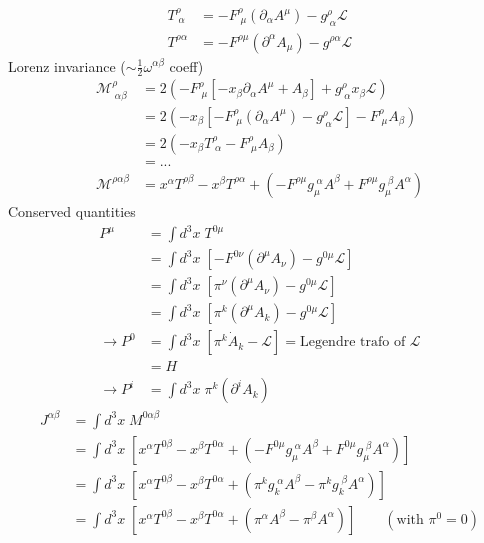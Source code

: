 \documentclass[10pt,a4paper]{report}
\theoremstyle{definition}
\begin{document}
\begin{enumerate}[a)]
\begin{align}
T^\rho_{\;\alpha}&=-F^\rho_{\;\mu}(\partial_\alpha A^\mu)-g^\rho_{\;\alpha}\mathcal{L}\\
T^{\rho\alpha}&=-F^{\rho\mu}(\partial^\alpha A_\mu)-g^{\rho\alpha}\mathcal{L}
\end{align}
Lorenz invariance ($\sim\frac{1}{2}\omega^{\alpha\beta}$ coeff)
\begin{align}
\mathcal{M}^{\rho}_{\;\alpha\beta}
&=2(-F^\rho_{\;\mu}[-x_\beta\partial_\alpha A^\mu+A_\beta]+g^\rho_{\;\alpha} x_\beta\mathcal{L})\\
&=2(-x_\beta[-F^\rho_{\;\mu}(\partial_\alpha A^\mu)-g^\rho_{\;\alpha}\mathcal{L}]-F^\rho_{\;\mu}A_\beta)\\
&=2(-x_\beta T^\rho_{\;\alpha}-F^\rho_{\;\mu}A_\beta)\\
&=...\\
\mathcal{M}^{\rho\alpha\beta}&=x^\alpha T^{\rho\beta}-x^\beta T^{\rho\alpha}+(-F^{\rho\mu}g_\mu^{\;\alpha}A^\beta+F^{\rho\mu}g_\mu^{\;\beta}A^\alpha)
\end{align}
Conserved quantities
\begin{align}
P^\mu
&=\int d^3x\;T^{0\mu}\\
&=\int d^3x\;[-F^{0\nu}(\partial^\mu A_\nu)-g^{0\mu}\mathcal{L}]\\
&=\int d^3x\;[\pi^\nu(\partial^\mu A_\nu)-g^{0\mu}\mathcal{L}]\\
&=\int d^3x\;[\pi^k(\partial^\mu A_k)-g^{0\mu}\mathcal{L}]\\
\rightarrow P^0
&=\int d^3x\;[\pi^k\dot{A}_k-\mathcal{L}]=\text{Legendre trafo of }\mathcal{L}\\
&=H\\
\rightarrow P^i&=\int d^3x\;\pi^k(\partial^iA_k)
\end{align}
\begin{align}
J^{\alpha\beta}
&=\int d^3x\;M^{0\alpha\beta}\\
&=\int d^3x\;[x^\alpha T^{0\beta}-x^\beta T^{0\alpha}+(-F^{0\mu}g_\mu^{\;\alpha}A^\beta+F^{0\mu}g_\mu^{\;\beta}A^\alpha)]\\
&=\int d^3x\;[x^\alpha T^{0\beta}-x^\beta T^{0\alpha}+(\pi^k g_k^{\;\alpha}A^\beta-\pi^k g_k^{\;\beta}A^\alpha)]\\
&=\int d^3x\;[x^\alpha T^{0\beta}-x^\beta T^{0\alpha}+(\pi^\alpha A^\beta-\pi^\beta A^\alpha)]\qquad(\text{with }\pi^0=0)
\end{align}

\end{enumerate}
\end{document}

